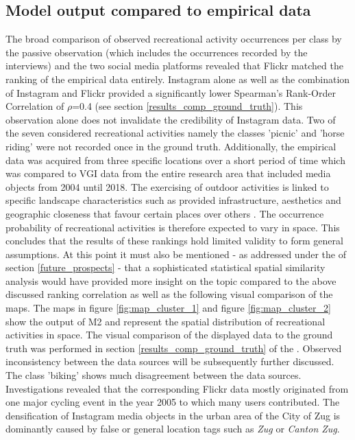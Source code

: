 \subsection{Model output compared to empirical data}
The broad comparison of observed recreational activity occurrences per class by the passive observation (which includes the occurrences recorded by the interviews) and the two social media platforms revealed that Flickr matched the ranking of the empirical data entirely. Instagram alone as well as the combination of Instagram and Flickr provided a significantly lower Spearman's Rank-Order Correlation of $\rho$=0.4 (see section \ref{results_comp_ground_truth}). This observation alone does not invalidate the credibility of Instagram data. Two of the seven considered recreational activities namely the classes 'picnic' and 'horse riding' were not recorded once in the ground truth. Additionally, the empirical data was acquired from three specific locations over a short period of time which was compared to VGI data from the entire research area that included media objects from 2004 until 2018. The exercising of outdoor activities is linked to specific landscape characteristics such as provided infrastructure, aesthetics and geographic closeness that favour certain places over others \parencite{Mancini2018}. The occurrence probability of recreational activities is therefore expected to vary in space. This concludes that the results of these rankings hold limited validity to form general assumptions. At this point it must also be mentioned - as addressed under the  of section \ref{future_prospects} - that a sophisticated statistical spatial similarity analysis would have provided more insight on the topic compared to the above discussed ranking correlation as well as the following visual comparison of the maps. The maps in figure \ref{fig:map_cluster_1} and figure \ref{fig:map_cluster_2} show the output of M2 and represent the spatial distribution of recreational activities in space. The visual comparison of the displayed data to the ground truth was performed in section \ref{results_comp_ground_truth} of the . Observed inconsistency between the data sources will be subsequently further discussed. \\

The class 'biking' shows much disagreement between the data sources. Investigations revealed that the corresponding Flickr data mostly originated from one major cycling event in the year 2005 to which many users contributed. The densification of Instagram media objects in the urban area of the City of Zug is dominantly caused by false or general location tags such as \textit{Zug} or \textit{Canton Zug}. \\

